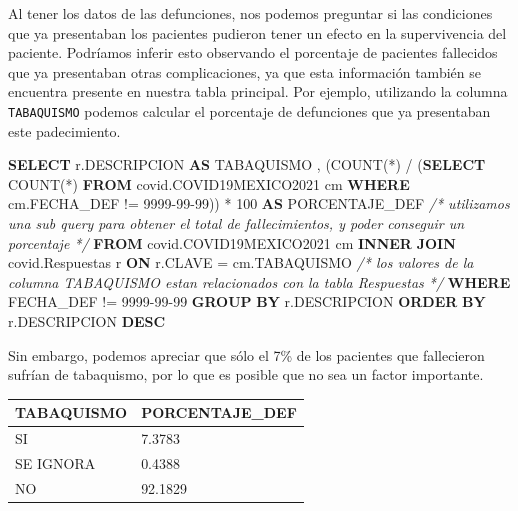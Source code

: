 \documentclass[11pt]{article}
\newenvironment{Shaded}{}{}
\newcommand{\KeywordTok}[1]{\textcolor[rgb]{0.00,0.44,0.13}{\textbf{{#1}}}}
\newcommand{\DecValTok}[1]{\textcolor[rgb]{0.25,0.63,0.44}{{#1}}}
\newcommand{\StringTok}[1]{\textcolor[rgb]{0.25,0.44,0.63}{{#1}}}
\newcommand{\CommentTok}[1]{\textcolor[rgb]{0.38,0.63,0.69}{\textit{{#1}}}}
\newcommand{\FunctionTok}[1]{\textcolor[rgb]{0.02,0.16,0.49}{{#1}}}
\newcommand{\NormalTok}[1]{{#1}}
\newcommand{\OperatorTok}[1]{\textcolor[rgb]{0.40,0.40,0.40}{{#1}}}
\begin{document}
Al tener los datos de las defunciones, nos podemos preguntar si las
condiciones que ya presentaban los pacientes pudieron tener un efecto en
la supervivencia del paciente. Podríamos inferir esto observando el
porcentaje de pacientes fallecidos que ya presentaban otras
complicaciones, ya que esta información también se encuentra presente en
nuestra tabla principal. Por ejemplo, utilizando la columna
\texttt{TABAQUISMO} podemos calcular el porcentaje de defunciones que ya
presentaban este padecimiento.

\begin{Shaded}
\begin{Highlighting}[]
\KeywordTok{SELECT}
\NormalTok{    r.DESCRIPCION }\KeywordTok{AS}\NormalTok{ TABAQUISMO  ,}
\NormalTok{    (}\FunctionTok{COUNT}\NormalTok{(}\OperatorTok{*}\NormalTok{) }\OperatorTok{/}\NormalTok{ (}\KeywordTok{SELECT} \FunctionTok{COUNT}\NormalTok{(}\OperatorTok{*}\NormalTok{) }\KeywordTok{FROM}\NormalTok{ covid.COVID19MEXICO2021 cm }\KeywordTok{WHERE}\NormalTok{ cm.FECHA\_DEF }\OperatorTok{!=} \StringTok{\textquotesingle{}9999{-}99{-}99\textquotesingle{}}\NormalTok{)) }\OperatorTok{*} \DecValTok{100} \KeywordTok{AS}\NormalTok{ PORCENTAJE\_DEF }\CommentTok{/* utilizamos una sub query para obtener el total de fallecimientos, y poder conseguir un porcentaje */}
\KeywordTok{FROM} 
\NormalTok{    covid.COVID19MEXICO2021 cm}
\KeywordTok{INNER} \KeywordTok{JOIN} 
\NormalTok{    covid.Respuestas r }\KeywordTok{ON}\NormalTok{ r.CLAVE }\OperatorTok{=}\NormalTok{ cm.TABAQUISMO  }\CommentTok{/* los valores de la columna TABAQUISMO estan relacionados con la tabla Respuestas */} 
\KeywordTok{WHERE} 
\NormalTok{    FECHA\_DEF }\OperatorTok{!=} \StringTok{\textquotesingle{}9999{-}99{-}99\textquotesingle{}}
\KeywordTok{GROUP} \KeywordTok{BY}
\NormalTok{    r.DESCRIPCION }
\KeywordTok{ORDER} \KeywordTok{BY}
\NormalTok{    r.DESCRIPCION }\KeywordTok{DESC}
\end{Highlighting}
\end{Shaded}

Sin embargo, podemos apreciar que sólo el 7\% de los pacientes que
fallecieron sufrían de tabaquismo, por lo que es posible que no sea un
factor importante.

\begin{longtable}[]{@{}ll@{}}
\toprule\noalign{}
TABAQUISMO & PORCENTAJE\_DEF \\
\midrule\noalign{}
\endhead
\bottomrule\noalign{}
\endlastfoot
SI & 7.3783 \\
SE IGNORA & 0.4388 \\
NO & 92.1829 \\
\end{longtable}
\end{document}
